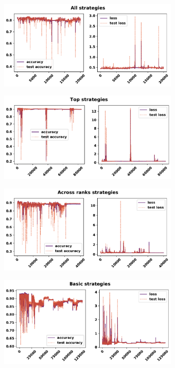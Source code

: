 \begin{figure}[!htbp]
    \begin{subfigure}{\textwidth}
    \centering
    \includegraphics[width=.8\textwidth]{src/chapters/07/img/validation_plot_all_strategies.pdf}
    \end{subfigure}\hfill
    \begin{subfigure}{\textwidth}
    \centering
    \includegraphics[width=.8\textwidth]{src/chapters/07/img/validation_plot_top_strategies.pdf}
    \end{subfigure}
    \begin{subfigure}{\textwidth}
    \centering
    \includegraphics[width=.8\textwidth]{src/chapters/07/img/validation_plot_across_ranks_strategies.pdf}
    \end{subfigure}
    \begin{subfigure}{\textwidth}
    \centering
    \includegraphics[width=.8\textwidth]{src/chapters/07/img/validation_plot_basic_strategies.pdf}

\end{subfigure}
\end{figure}
